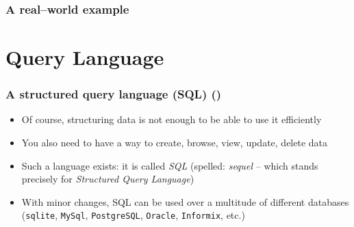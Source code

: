 \documentclass[\printmode,compress,xcolor=dvipsnames]{beamer}
\begin{document}
\begin{frame}
  \frametitle<+->{A real--world example}

  \begin{center}
  \end{center}

\end{frame}

\section[SQL]{Query Language}

\setcounter{ms}{0}
\begin{frame}
  \frametitle<+->{A structured query language (SQL) ()}

  \begin{itemize}[<+- | alert@+->]

    \item Of course, structuring data is not enough to be able to use it
          efficiently

    \item You also need to have a way to create, browse, view, update, delete
          data 

    \item Such a language exists: it is called \emph{SQL} (spelled:
            \emph{sequel} -- which stands precisely for \emph{Structured Query
            Language})

    \item With minor changes, SQL can be used over a multitude of different
            databases ({\tt sqlite}, {\tt MySql}, {\tt PostgreSQL}, {\tt Oracle}, {\tt Informix}, etc.)

  \end{itemize}

\end{frame}
\end{document}
